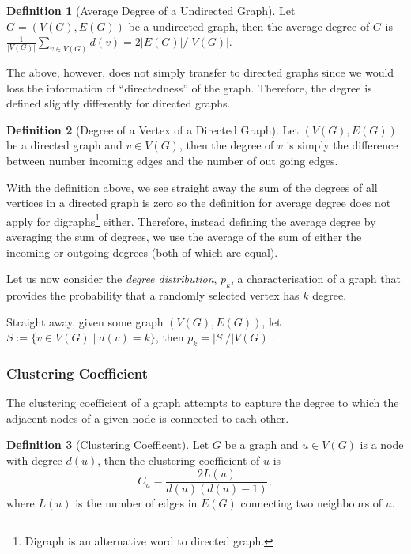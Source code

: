 \documentclass[
]{article}
\theoremstyle{definition}
\theoremstyle{definition}
\newtheorem{definition}{Definition}[section]
\begin{document}
\begin{definition}[Average Degree of a Undirected Graph]
  Let \(G = (V(G), E(G))\) be a undirected graph, then the average degree of 
  \(G\) is \(\frac{1}{\left| V(G) \right|} \sum_{v \in V(G)} d(v) = 
  2 \left| E(G) \right| / \left| V(G) \right|\).
\end{definition}

The above, however, does not simply transfer to directed graphs since we
would loss the information of ``directedness'' of the graph. Therefore,
the degree is defined slightly differently for directed graphs.

\begin{definition}[Degree of a Vertex of a Directed Graph]
  Let \((V(G), E(G))\) be a directed graph and \(v \in V(G)\), then the degree 
  of \(v\) is simply the difference between number incoming edges and the number 
  of out going edges. 
\end{definition}

With the definition above, we see straight away the sum of the degrees
of all vertices in a directed graph is zero so the definition for
average degree does not apply for
digraphs\footnote{Digraph is an alternative word to directed graph.}
either. Therefore, instead defining the average degree by averaging the
sum of degrees, we use the average of the sum of either the incoming or
outgoing degrees (both of which are equal).

Let us now consider the \emph{degree distribution}, \(p_k\), a
characterisation of a graph that provides the probability that a
randomly selected vertex has \(k\) degree.

Straight away, given some graph \((V(G), E(G))\), let
\(S := \{ v \in V(G) \mid d(v) = k \}\), then
\(p_k = \left| S \right| / \left| V(G) \right|\).

\hypertarget{clustering-coefficient}{%
\subsubsection{Clustering Coefficient}\label{clustering-coefficient}}

The clustering coefficient of a graph attempts to capture the degree to
which the adjacent nodes of a given node is connected to each other.

\begin{definition}[Clustering Coefficent]
  Let \(G\) be a graph and \(u \in V(G)\) is a node with degree \(d(u)\), then 
  the clustering coefficient of \(u\) is 
  \[
    C_u = \frac{2 L(u)}{d(u)(d(u) - 1)},
  \]
  where \(L(u)\) is the number of edges in \(E(G)\) connecting two neighbours of 
  \(u\).
\end{definition}
\end{document}
